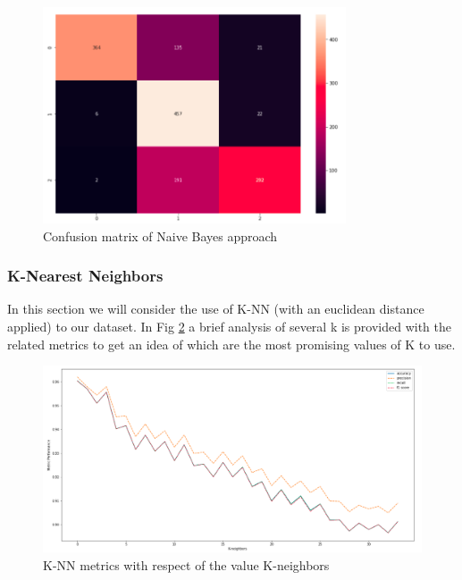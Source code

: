 \documentclass[a4paper,12pt]{article}
\begin{document}
\begin{figure}[H]
  \begin{center}
  \includegraphics[width=0.8\textwidth]{images/confusion_naive.png}
  \end{center}
  \caption{Confusion matrix of Naive Bayes approach}
  \label{fig:confusion_bayes}
\end{figure}

\subsubsection{K-Nearest Neighbors}
In this section we will consider the use of K-NN (with an euclidean distance applied) to our dataset. In Fig \ref{fig:knn} a brief analysis of several k is provided with the related metrics to get an idea of which are the most promising values of K to use.

\begin{figure}[H]
  \begin{center}
  \includegraphics[width=1.0\textwidth]{images/knn.png}
  \end{center}
  \caption{K-NN metrics with respect of the value K-neighbors}
  \label{fig:knn}
\end{figure}
\end{document}
